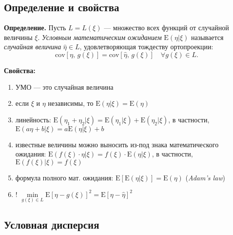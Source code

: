 \documentclass[11pt,a4paper]{article}
\providecommand{\tightlist}{%
      \setlength{\itemsep}{0pt}\setlength{\parskip}{0pt}}
\begin{document}
    \hypertarget{ux43eux43fux440ux435ux434ux435ux43bux435ux43dux438ux435-ux438-ux441ux432ux43eux439ux441ux442ux432ux430}{%
\subsection{Определение и
свойства}\label{ux43eux43fux440ux435ux434ux435ux43bux435ux43dux438ux435-ux438-ux441ux432ux43eux439ux441ux442ux432ux430}}

\textbf{Определение.} Пусть \(L = L(\xi)\) --- множество всех функций от
случайной величины \(\xi\). \emph{Условным математическим ожиданием}
\(\mathrm{E}(\eta|\xi)\) называется \emph{случайная величина}
\(\hat{\eta} \in L\), удовлетворяющая тождеству ортопроекции: \[
  \mathrm{cov}\left[ \eta,\, g(\xi) \right] = \mathrm{cov}\left[ \hat{\eta},\, g(\xi) \right] \quad \forall g(\xi) \in L.  
\]

    \textbf{Свойства:}

\begin{enumerate}
\def\labelenumi{\arabic{enumi}.}
\tightlist
\item
  УМО --- это случайная величина
\item
  если \(\xi\) и \(\eta\) независимы, то
  \(\mathrm{E}(\eta|\xi) = \mathrm{E}(\eta)\)
\item
  линейность:
  \(\mathrm{E}(\eta_1 + \eta_2|\xi) = \mathrm{E}(\eta_1|\xi) + \mathrm{E}(\eta_2|\xi)\),
  в частности, \(\mathrm{E}(a\eta + b|\xi) = a\mathrm{E}(\eta|\xi) + b\)
\item
  известные величины можно выносить из-под знака математического
  ожидания:
  \(\mathrm{E}(f(\xi) \cdot \eta|\xi) = f(\xi) \cdot \mathrm{E}(\eta|\xi)\),
  в частности, \(\mathrm{E}(f(\xi)|\xi) = f(\xi)\)
\item
  формула полного мат. ожидания:
  \(\mathrm{E}\left[ \mathrm{E}(\eta|\xi) \right] = \mathrm{E}(\eta)\)
  (\emph{Adam's law})
\item
  !
  \(\min\limits_{g(\xi) \in L} \mathrm{E}[\eta - g(\xi)]^2 = \mathrm{E}[\eta - \hat{\eta}]^2\)
\end{enumerate}

    \hypertarget{ux443ux441ux43bux43eux432ux43dux430ux44f-ux434ux438ux441ux43fux435ux440ux441ux438ux44f}{%
\subsection{Условная
дисперсия}\label{ux443ux441ux43bux43eux432ux43dux430ux44f-ux434ux438ux441ux43fux435ux440ux441ux438ux44f}}
\end{document}
